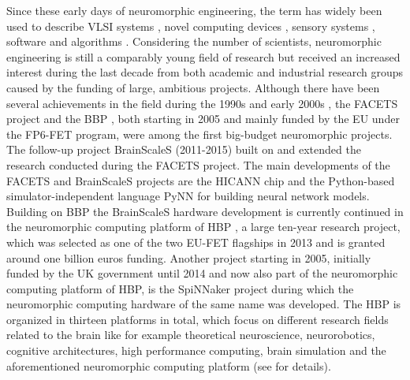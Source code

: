 Since these early days of neuromorphic engineering, the term has widely been used to describe \ac{VLSI} systems \cite{Mead1989}, novel computing devices \cite{Schemmel2010}, sensory systems \cite{Lichtsteiner2008, Liu2010}, software \cite{Davison2008, Bekolay2014} and algorithms \cite{ReverterValeiras2016}.
Considering the number of scientists, neuromorphic engineering is still a comparably young field of research but received an increased interest during the last decade from both academic and industrial research groups caused by the funding of large, ambitious projects.
Although there have been several achievements in the field during the 1990s \cite{Mead1989, Mahowald1992, Indiveri1997, Cauwenberghs1998} and early 2000s \cite{Liu2002}, the \ac{FACETS} project \cite{FACETS-proj} and the \ac{BBP} \cite{BlueBrain-proj}, both starting in 2005 and mainly funded by the \ac{EU} under the FP6-\ac{FET} program, were among the first big-budget neuromorphic projects.
The follow-up project \ac{BrainScaleS} \cite{BrainScaleS-proj, Schemmel2010} (2011-2015) built on and extended the research conducted during the \ac{FACETS} project.
The main developments of the \ac{FACETS} and \ac{BrainScaleS} projects are the \ac{HICANN} chip \cite{Schemmel2010} and the Python-based simulator-independent language \ac{PyNN} \cite{Davison2008} for building neural network models.
Building on \ac{BBP} the \ac{BrainScaleS} hardware development is currently continued in the neuromorphic computing platform of \ac{HBP} \cite{HBP-proj, Calimera2013}, a large ten-year research project, which was selected as one of the two \ac{EU}-\ac{FET} flagships in 2013 and is granted around one billion euros funding.
Another project starting in 2005, initially funded by the UK government until 2014 and now also part of the neuromorphic computing platform of \ac{HBP}, is the \ac{SpiNNaker} project \cite{Furber2014} during which the neuromorphic computing hardware of the same name was developed.
The \ac{HBP} is organized in thirteen platforms in total, which focus on different research fields related to the brain like for example theoretical neuroscience, neurorobotics, cognitive architectures, high performance computing, brain simulation and the aforementioned neuromorphic computing platform (see \cite{HBP-proj} for details).

